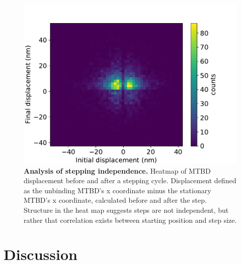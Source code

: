 \documentclass[9pt,twocolumn,twoside]{pnas-new}
\begin{document}
\begin{figure}[tbhp]
  \centering
  \includegraphics[width=\linewidth]{../../plots/paper_initial_vs_final_displacement.pdf}
  \caption{\textbf{Analysis of stepping independence.} Heatmap of MTBD displacement before and after a stepping cycle. Displacement defined as the unbinding MTBD's x coordinate minus the stationary MTBD's x coordinate, calculated before and after the step. Structure in the heat map suggests steps are not independent, but rather that correlation exists between starting position and step size.}
\label{fig:independence}
\end{figure}


\section{Discussion}
\end{document}
